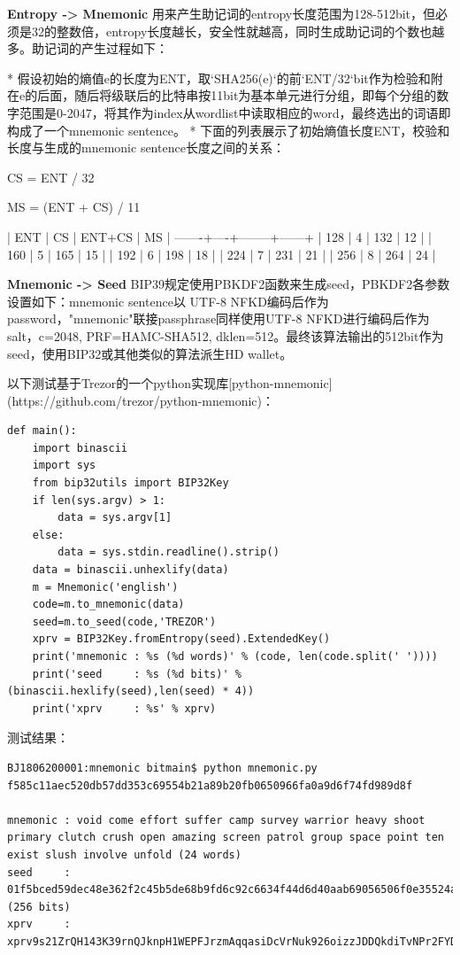 \documentclass{article}
\begin{document}
\textbf{Entropy -> Mnemonic}
用来产生助记词的entropy长度范围为128-512bit，但必须是32的整数倍，entropy长度越长，安全性就越高，同时生成助记词的个数也越多。助记词的产生过程如下：

* 假设初始的熵值e的长度为ENT，取`SHA256(e)`的前`ENT/32`bit作为检验和附在e的后面，随后将级联后的比特串按11bit为基本单元进行分组，即每个分组的数字范围是0-2047，将其作为index从wordlist中读取相应的word，最终选出的词语即构成了一个mnemonic sentence。
* 下面的列表展示了初始熵值长度ENT，校验和长度与生成的mnemonic sentence长度之间的关系：


		CS = ENT / 32
		
		MS = (ENT + CS) / 11
		
		|  ENT  | CS | ENT+CS |  MS  |
		-------+----+--------+------+
		|  128  |  4 |   132  |  12  |
		|  160  |  5 |   165  |  15  |
		|  192  |  6 |   198  |  18  |
		|  224  |  7 |   231  |  21  |
		|  256  |  8 |   264  |  24  |


\textbf{Mnemonic -> Seed}
BIP39规定使用PBKDF2函数来生成seed，PBKDF2各参数设置如下：mnemonic sentence以 UTF-8 NFKD编码后作为password，"mnemonic"联接passphrase同样使用UTF-8 NFKD进行编码后作为salt，c=2048, PRF=HAMC-SHA512, dklen=512。最终该算法输出的512bit作为 seed，使用BIP32或其他类似的算法派生HD wallet。


以下测试基于Trezor的一个python实现库[python-mnemonic](https://github.com/trezor/python-mnemonic)：

\begin{lstlisting}
def main():
    import binascii
    import sys
    from bip32utils import BIP32Key
    if len(sys.argv) > 1:
        data = sys.argv[1]
    else:
        data = sys.stdin.readline().strip()
    data = binascii.unhexlify(data)
    m = Mnemonic('english')
    code=m.to_mnemonic(data)
    seed=m.to_seed(code,'TREZOR')
    xprv = BIP32Key.fromEntropy(seed).ExtendedKey()
    print('mnemonic : %s (%d words)' % (code, len(code.split(' '))))
    print('seed     : %s (%d bits)' % (binascii.hexlify(seed),len(seed) * 4))
    print('xprv     : %s' % xprv)
\end{lstlisting}

测试结果：
\begin{lstlisting}
BJ1806200001:mnemonic bitmain$ python mnemonic.py f585c11aec520db57dd353c69554b21a89b20fb0650966fa0a9d6f74fd989d8f

mnemonic : void come effort suffer camp survey warrior heavy shoot primary clutch crush open amazing screen patrol group space point ten exist slush involve unfold (24 words)
seed     : 01f5bced59dec48e362f2c45b5de68b9fd6c92c6634f44d6d40aab69056506f0e35524a518034ddc1192e1dacd32c1ed3eaa3c3b131c88ed8e7e54c49a5d0998 (256 bits)
xprv     : xprv9s21ZrQH143K39rnQJknpH1WEPFJrzmAqqasiDcVrNuk926oizzJDDQkdiTvNPr2FYDYzWgiMiC63YmfPAa2oPyNB23r2g7d1yiK6WpqaQS
\end{lstlisting}
\end{document}
